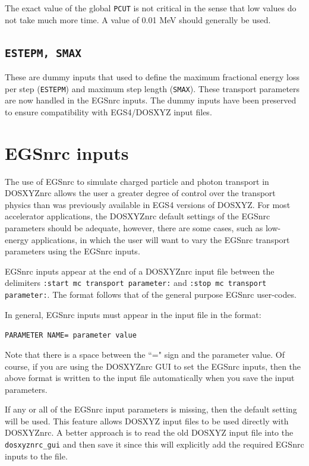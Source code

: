 \documentclass[12pt,twoside]{article}      %
\newcommand{\indexm}[1]{\index{#1}}
\begin{document}
The exact value of the global \verb+PCUT+ is not critical in the sense that low
values do not take much more time. A value of 0.01 MeV
should generally be used.

\subsection{{\tt ESTEPM, SMAX}}
\indexm{ESTEPM}
\indexm{SMAX}

These are dummy inputs that used to define the
maximum fractional energy loss per step ({\tt ESTEPM}) and maximum
step length ({\tt SMAX}).  These transport parameters are now handled in the
EGSnrc inputs.  The dummy inputs have been preserved to ensure compatibility
with EGS4/DOSXYZ input files.

\section{EGSnrc inputs}
\label{egsnrc_inputs}

The use of EGSnrc to simulate charged particle and photon transport
in DOSXYZnrc allows the user a greater degree of control over the
transport physics
than was previously available in EGS4 versions of DOSXYZ.  For most
accelerator applications, the DOSXYZnrc default settings of the EGSnrc
parameters should be adequate, however, there are some cases, such
as low-energy applications, in which the user will want to vary
the EGSnrc transport parameters using the EGSnrc inputs.

EGSnrc inputs appear at the end of a DOSXYZnrc input file between the
delimiters {\tt :start mc transport parameter:} and
{\tt :stop mc transport parameter:}.  The format follows that of the
general purpose EGSnrc user-codes\cite{Ro00}.


In general, EGSnrc inputs must appear in the input file in
the format:

{\tt PARAMETER NAME= parameter value}

Note that there is a space between the ``=" sign and the parameter value.
Of course, if you are using the DOSXYZnrc GUI to set the EGSnrc inputs, then
the above format is written to the input file automatically when you save
the input parameters.

If any or all of the EGSnrc input parameters is missing, then the default
setting will be used. This feature allows DOSXYZ input files to be used
directly with DOSXYZnrc. A better approach is to read the old DOSXYZ input
file into the {\tt dosxyznrc\_gui} and then save it since this will explicitly
add the required EGSnrc inputs to the file.
\end{document}
